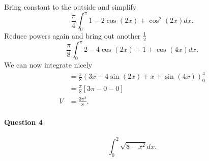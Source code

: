 \documentclass[a4paper]{article}
\begin{document}
Bring constant to the outside and simplify
\[
  \frac{\pi}{4}\int_{0}^{\pi} 1-2\cos^{}(2x)+\cos^{2}(2x)dx
.\] 
Reduce powers again and bring out another $\frac{1}{2}$ 
\[
\frac{\pi}{8}\int_{0}^{\pi } 2-4\cos^{}(2x)+1+\cos^{}(4x)dx
.\]
We can now integrate nicely
\begin{align*}
  &= \frac{\pi}{8}\left( 3x-4\sin^{}(2x)+x+\sin^{}(4x) \right)^{4}_{0} \\
  &= \frac{\pi}{8}[3\pi-0-0] \\
 V &= \frac{3\pi^2}{8} 
.\end{align*}
\newpage
\paragraph{Question 4}

\[
\int_{0}^{2} \sqrt{8-x^2}dx 
.\] 
\end{document}

